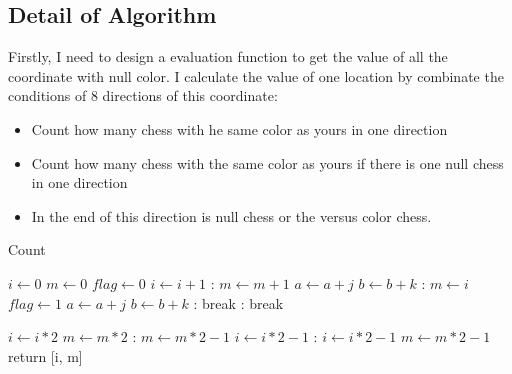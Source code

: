 \documentclass[conference,compsoc]{IEEEtran}
\begin{document}
\subsection{Detail of Algorithm}
  Firstly, I need to design a evaluation function to get the value of all the coordinate with null color.
  I calculate the value of one location by combinate the conditions of 8 directions of this coordinate:
  \begin{itemize}
    \item Count how many chess with he same color as yours in one direction
    \item Count how many chess with the same color as yours if there is one null chess in one direction
    \item In the end of this direction is null chess or the versus color chess.
  \end{itemize}
  \begin{algorithm}
    \caption {Count}
    \begin{algorithmic}[1]
      \State $  i\gets 0  $
      \State $  m\gets 0  $
      \State $  flag\gets 0  $
                  \State $  i\gets i + 1  $
                  \Else:
                  \State $  m\gets m + 1  $
              \State $  a\gets a + j  $
              \State $  b\gets b + k  $
                  \EndIf
              \Else:
                      \State $  m\gets i  $
                      \State $  flag\gets 1  $
                      \State $  a\gets a + j  $
                      \State $  b\gets b + k  $
                      \Else:
                          break
                      \EndIf
                  \Else:
                      break
                  \EndIf
              \EndIf
          \EndWhile

              \State $  i\gets i * 2  $
              \State $  m\gets m * 2  $
              \Else:
              \State $  m\gets m * 2 - 1  $
              \State $  i\gets i * 2 - 1  $
              \EndIf
          \Else:
          \State $  i\gets i * 2 - 1  $
          \State $  m\gets m * 2 - 1  $
          \EndIf
          return [i, m]
      \EndFunction
    \end{algorithmic}
  \end{algorithm}
  
\end{document}
